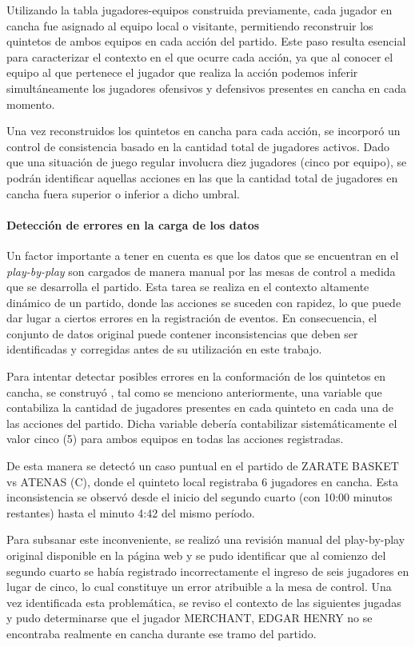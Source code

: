 \documentclass[
]{article}
\begin{document}
Utilizando la tabla jugadores-equipos construida previamente, cada
jugador en cancha fue asignado al equipo local o visitante, permitiendo
reconstruir los quintetos de ambos equipos en cada acción del partido.
Este paso resulta esencial para caracterizar el contexto en el que
ocurre cada acción, ya que al conocer el equipo al que pertenece el
jugador que realiza la acción podemos inferir simultáneamente los
jugadores ofensivos y defensivos presentes en cancha en cada momento.

Una vez reconstruidos los quintetos en cancha para cada acción, se
incorporó un control de consistencia basado en la cantidad total de
jugadores activos. Dado que una situación de juego regular involucra
diez jugadores (cinco por equipo), se podrán identificar aquellas
acciones en las que la cantidad total de jugadores en cancha fuera
superior o inferior a dicho umbral.

\paragraph{Detección de errores en la carga de los
datos}\label{detecciuxf3n-de-errores-en-la-carga-de-los-datos}

Un factor importante a tener en cuenta es que los datos que se
encuentran en el \emph{play-by-play} son cargados de manera manual por
las mesas de control a medida que se desarrolla el partido. Esta tarea
se realiza en el contexto altamente dinámico de un partido, donde las
acciones se suceden con rapidez, lo que puede dar lugar a ciertos
errores en la registración de eventos. En consecuencia, el conjunto de
datos original puede contener inconsistencias que deben ser
identificadas y corregidas antes de su utilización en este trabajo.

Para intentar detectar posibles errores en la conformación de los
quintetos en cancha, se construyó , tal como se menciono anteriormente,
una variable que contabiliza la cantidad de jugadores presentes en cada
quinteto en cada una de las acciones del partido. Dicha variable debería
contabilizar sistemáticamente el valor cinco (5) para ambos equipos en
todas las acciones registradas.

De esta manera se detectó un caso puntual en el partido de ZARATE BASKET
vs ATENAS (C), donde el quinteto local registraba 6 jugadores en cancha.
Esta inconsistencia se observó desde el inicio del segundo cuarto (con
10:00 minutos restantes) hasta el minuto 4:42 del mismo período.

Para subsanar este inconveniente, se realizó una revisión manual del
play-by-play original disponible en la página web y se pudo identificar
que al comienzo del segundo cuarto se había registrado incorrectamente
el ingreso de seis jugadores en lugar de cinco, lo cual constituye un
error atribuible a la mesa de control. Una vez identificada esta
problemática, se reviso el contexto de las siguientes jugadas y pudo
determinarse que el jugador MERCHANT, EDGAR HENRY no se encontraba
realmente en cancha durante ese tramo del partido.
\end{document}
